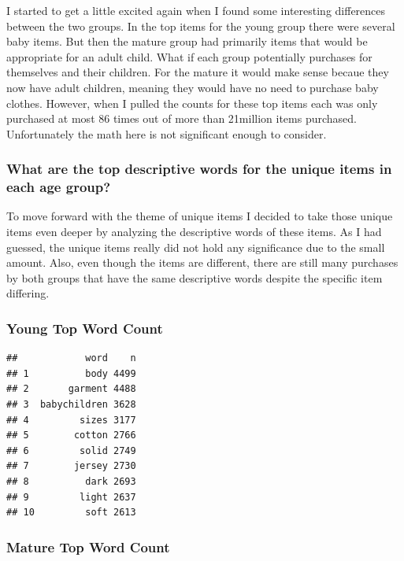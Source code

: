 \documentclass[
]{article}
\begin{document}
I started to get a little excited again when I found some interesting
differences between the two groups. In the top items for the young group
there were several baby items. But then the mature group had primarily
items that would be appropriate for an adult child. What if each group
potentially purchases for themselves and their children. For the mature
it would make sense becaue they now have adult children, meaning they
would have no need to purchase baby clothes. However, when I pulled the
counts for these top items each was only purchased at most 86 times out
of more than 21million items purchased. Unfortunately the math here is
not significant enough to consider.

\hypertarget{what-are-the-top-descriptive-words-for-the-unique-items-in-each-age-group}{%
\subsubsection{What are the top descriptive words for the unique items
in each age
group?}\label{what-are-the-top-descriptive-words-for-the-unique-items-in-each-age-group}}

To move forward with the theme of unique items I decided to take those
unique items even deeper by analyzing the descriptive words of these
items. As I had guessed, the unique items really did not hold any
significance due to the small amount. Also, even though the items are
different, there are still many purchases by both groups that have the
same descriptive words despite the specific item differing.

\hypertarget{young-top-word-count}{%
\subsubsection{Young Top Word Count}\label{young-top-word-count}}

\begin{verbatim}
##            word    n
## 1          body 4499
## 2       garment 4488
## 3  babychildren 3628
## 4         sizes 3177
## 5        cotton 2766
## 6         solid 2749
## 7        jersey 2730
## 8          dark 2693
## 9         light 2637
## 10         soft 2613
\end{verbatim}

\hypertarget{mature-top-word-count}{%
\subsubsection{Mature Top Word Count}\label{mature-top-word-count}}
\end{document}
